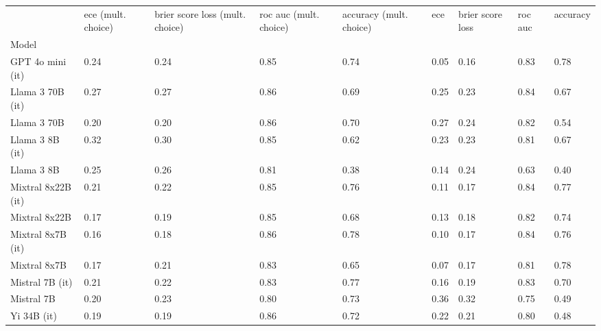\begin{tabular}{lllllllll}
\toprule
 & ece (mult. choice) & brier score loss (mult. choice) & roc auc (mult. choice) & accuracy (mult. choice) & ece & brier score loss & roc auc & accuracy \\
Model &  &  &  &  &  &  &  &  \\
\midrule
GPT 4o mini (it) & 0.24 & 0.24 & \cellcolor{cyan!17.6} 0.85 & 0.74 & \cellcolor{cyan!25.0} 0.05 & \cellcolor{cyan!25.0} 0.16 & \cellcolor{cyan!20.6} 0.83 & \cellcolor{cyan!24.4} 0.78 \\
Llama 3 70B (it) & 0.27 & 0.27 & \cellcolor{cyan!25.0} 0.86 & 0.69 & 0.25 & 0.23 & \cellcolor{cyan!22.1} 0.84 & 0.67 \\
Llama 3 70B & 0.20 & \cellcolor{cyan!14.9} 0.20 & \cellcolor{cyan!20.8} 0.86 & 0.70 & 0.27 & 0.24 & \cellcolor{cyan!6.7} 0.82 & 0.54 \\
Llama 3 8B (it) & 0.32 & 0.30 & \cellcolor{cyan!13.3} 0.85 & 0.62 & 0.23 & 0.23 & \cellcolor{cyan!0.1} 0.81 & 0.67 \\
Llama 3 8B & 0.25 & 0.26 & 0.81 & \cellcolor{orange!20.8} 0.38 & 0.14 & 0.24 & 0.63 & \cellcolor{orange!3.7} 0.40 \\
Mixtral 8x22B (it) & 0.21 & \cellcolor{cyan!3.6} 0.22 & \cellcolor{cyan!11.2} 0.85 & \cellcolor{cyan!11.1} 0.76 & 0.11 & \cellcolor{cyan!15.5} 0.17 & \cellcolor{cyan!25.0} 0.84 & \cellcolor{cyan!18.9} 0.77 \\
Mixtral 8x22B & \cellcolor{cyan!13.2} 0.17 & \cellcolor{cyan!21.6} 0.19 & \cellcolor{cyan!16.5} 0.85 & 0.68 & 0.13 & \cellcolor{cyan!3.6} 0.18 & \cellcolor{cyan!9.6} 0.82 & \cellcolor{cyan!2.4} 0.74 \\
Mixtral 8x7B (it) & \cellcolor{cyan!16.8} 0.16 & \cellcolor{cyan!25.0} 0.18 & \cellcolor{cyan!19.7} 0.86 & \cellcolor{cyan!25.0} 0.78 & 0.10 & \cellcolor{cyan!15.5} 0.17 & \cellcolor{cyan!22.8} 0.84 & \cellcolor{cyan!12.8} 0.76 \\
Mixtral 8x7B & \cellcolor{cyan!10.6} 0.17 & \cellcolor{cyan!11.5} 0.21 & 0.83 & 0.65 & \cellcolor{cyan!4.0} 0.07 & \cellcolor{cyan!13.1} 0.17 & \cellcolor{cyan!3.7} 0.81 & \cellcolor{cyan!25.0} 0.78 \\
Mistral 7B (it) & 0.21 & \cellcolor{cyan!4.7} 0.22 & 0.83 & \cellcolor{cyan!16.5} 0.77 & 0.16 & 0.19 & \cellcolor{cyan!14.7} 0.83 & 0.70 \\
Mistral 7B & 0.20 & 0.23 & 0.80 & 0.73 & \cellcolor{orange!15.7} 0.36 & 0.32 & 0.75 & 0.49 \\
Yi 34B (it) & \cellcolor{cyan!1.3} 0.19 & \cellcolor{cyan!18.8} 0.19 & \cellcolor{cyan!19.7} 0.86 & 0.72 & 0.22 & 0.21 & 0.80 & 0.48 \\

\end{tabular}
